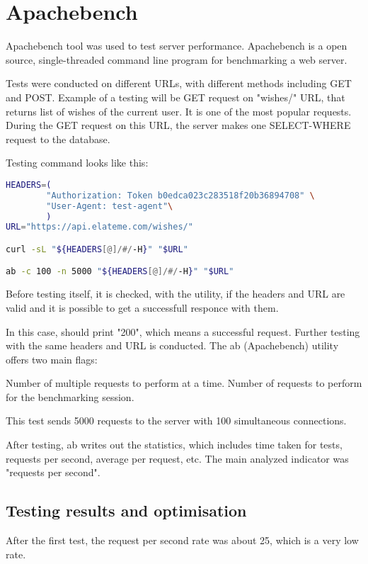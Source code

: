 \newcommand{\bnitem}[1]{
\item\textbf{#1}.}
\section{Apachebench}
Apachebench tool was used to test server performance. Apachebench is a open source, single-threaded command line program
for benchmarking a web server.

Tests were conducted on different \ac{URL}s, with different methods including GET and POST. Example of a testing will be
GET request on "wishes/" \ac{URL}, that returns list of wishes of the current user. It is one of the most popular
requests. During the GET request on this \ac{URL}, the server makes one SELECT-WHERE request to the database.

Testing command looks like this:

\begin{lstlisting}[language=bash]
HEADERS=(
        "Authorization: Token b0edca023c283518f20b36894708" \
        "User-Agent: test-agent"\
        )
URL="https://api.elateme.com/wishes/"

curl -sL "${HEADERS[@]/#/-H}" "$URL"

ab -c 100 -n 5000 "${HEADERS[@]/#/-H}" "$URL"
\end{lstlisting}
Before testing itself, it is checked, with the  utility, if the headers and \ac{URL} are valid and it is
possible to get a successfull responce with them.

In this case,  should print "200", which means a successful request. Further testing with the same headers
and \ac{URL} is conducted. The ab (Apachebench) utility offers two main flags:

\begin{itemize}
 Number of multiple requests to perform at a time.
\flag{n} Number of requests to perform for the benchmarking session.
\end{itemize}

This test sends 5000 requests to the server with 100 simultaneous connections.

After testing, ab writes out the statistics, which includes time taken for tests, requests per second, average per
request, etc. The main analyzed indicator was "requests per second".

\subsection{Testing results and optimisation}
After the first test, the request per second rate was about 25, which is a very low rate.

